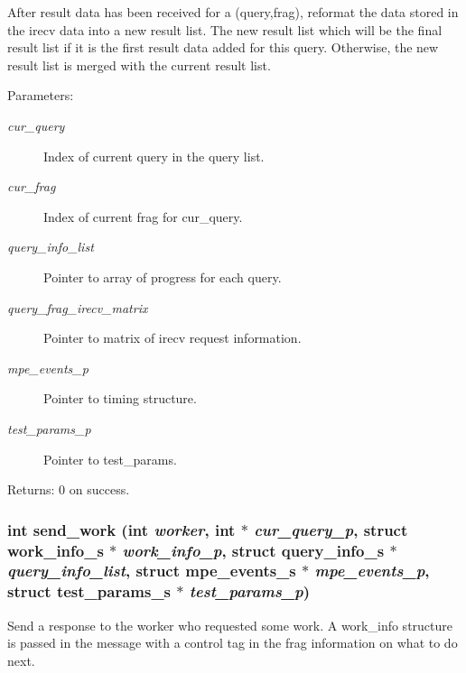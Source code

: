 After result data has been received for a (query,frag), reformat the data stored in the irecv data into a new result list. The new result list which will be the final result list if it is the first result data added for this query. Otherwise, the new result list is merged with the current result list.

\begin{Desc}
\item[Parameters:]
\begin{description}
\item[{\em cur\_\-query}]Index of current query in the query list. \item[{\em cur\_\-frag}]Index of current frag for cur\_\-query. \item[{\em query\_\-info\_\-list}]Pointer to array of progress for each query. \item[{\em query\_\-frag\_\-irecv\_\-matrix}]Pointer to matrix of irecv request information. \item[{\em mpe\_\-events\_\-p}]Pointer to timing structure. \item[{\em test\_\-params\_\-p}]Pointer to test\_\-params. \end{description}
\end{Desc}
\begin{Desc}
\item[Returns:]0 on success. \end{Desc}
\subsubsection{\setlength{\rightskip}{0pt plus 5cm}int send\_\-work (int {\em worker}, int $\ast$ {\em cur\_\-query\_\-p}, struct \bf{work\_\-info\_\-s} $\ast$ {\em work\_\-info\_\-p}, struct \bf{query\_\-info\_\-s} $\ast$ {\em query\_\-info\_\-list}, struct \bf{mpe\_\-events\_\-s} $\ast$ {\em mpe\_\-events\_\-p}, struct \bf{test\_\-params\_\-s} $\ast$ {\em test\_\-params\_\-p})}\label{master__help_8h_deb96e13f94645e4c7975cc6afbd2576}


Send a response to the worker who requested some work. A work\_\-info structure is passed in the message with a control tag in the frag information on what to do next.

